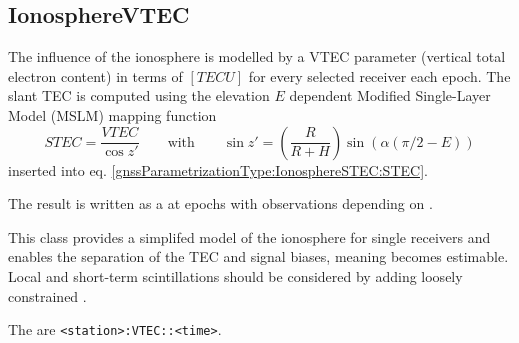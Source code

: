 \subsection{IonosphereVTEC}\label{gnssParametrizationType:ionosphereVTEC}
The influence of the ionosphere is modelled by a VTEC parameter (vertical total electron content)
in terms of $[TECU]$ for every selected receiver each epoch. The slant TEC is computed
using the elevation $E$ dependent Modified Single-Layer Model (MSLM) mapping function
\begin{equation}\label{gnssParametrizationType:IonosphereVTEC:STEC}
  STEC = \frac{VTEC}{\cos z'}
  \qquad\text{with}\qquad
  \sin z'= \left(\frac{R}{R+H}\right)\sin\left(\alpha(\pi/2-E)\right)
\end{equation}
inserted into eq. \eqref{gnssParametrizationType:IonosphereSTEC:STEC}.

The result is written as a  at epochs with observations
depending on .

This class provides a simplifed model of the ionosphere for single receivers
and enables the separation of the TEC and signal biases, meaning
 becomes estimable.
Local and short-term scintillations should be considered by adding loosely constrained
.

The  are \verb|<station>:VTEC::<time>|.


